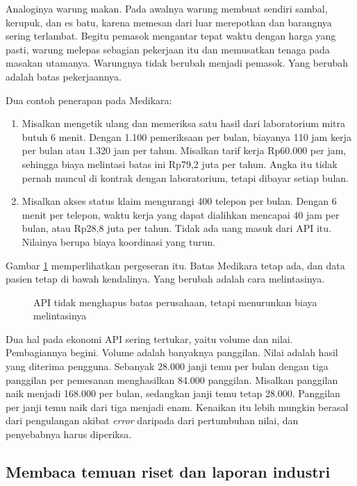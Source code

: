 Analoginya warung makan. Pada awalnya warung membuat sendiri sambal, kerupuk, dan es batu, karena
memesan dari luar merepotkan dan barangnya sering terlambat. Begitu pemasok mengantar tepat waktu
dengan harga yang pasti, warung melepas sebagian pekerjaan itu dan memusatkan tenaga pada masakan
utamanya. Warungnya tidak berubah menjadi pemasok. Yang berubah adalah batas pekerjaannya.

Dua contoh penerapan pada Medikara:
\begin{enumerate}
  \item Misalkan mengetik ulang dan memeriksa satu hasil dari laboratorium mitra butuh 6 menit. Dengan
        1.100 pemeriksaan per bulan, biayanya 110 jam kerja per bulan atau 1.320 jam per tahun.
        Misalkan tarif kerja Rp60.000 per jam, sehingga biaya melintasi batas ini Rp79,2 juta per
        tahun. Angka itu tidak pernah muncul di kontrak dengan laboratorium, tetapi dibayar setiap
        bulan.
  \item Misalkan akses status klaim mengurangi 400 telepon per bulan. Dengan 6 menit per telepon, waktu
        kerja yang dapat dialihkan mencapai 40 jam per bulan, atau Rp28,8 juta per tahun. Tidak ada
        uang masuk dari API itu. Nilainya berupa biaya koordinasi yang turun.
\end{enumerate}

Gambar \ref{fig:ch04-batas-perusahaan} memperlihatkan pergeseran itu. Batas Medikara tetap ada, dan
data pasien tetap di bawah kendalinya. Yang berubah adalah cara melintasinya.

\begin{figure}[!htb]
  \centering
  
  \caption{API tidak menghapus batas perusahaan, tetapi menurunkan biaya melintasinya}
  \label{fig:ch04-batas-perusahaan}
\end{figure}

Dua hal pada ekonomi API sering tertukar, yaitu volume dan nilai. Pembagiannya begini. Volume adalah
banyaknya panggilan. Nilai adalah hasil yang diterima pengguna. Sebanyak 28.000 janji temu per bulan
dengan tiga panggilan per pemesanan menghasilkan 84.000 panggilan. Misalkan panggilan naik menjadi
168.000 per bulan, sedangkan janji temu tetap 28.000. Panggilan per janji temu naik dari tiga menjadi
enam. Kenaikan itu lebih mungkin berasal dari pengulangan akibat \textit{error} daripada dari
pertumbuhan nilai, dan penyebabnya harus diperiksa.

\subsection*{Membaca temuan riset dan laporan industri}

